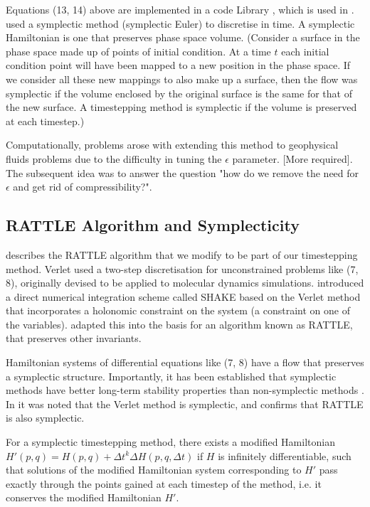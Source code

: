 \documentclass[11pt, oneside]{article}   	%
\newcommand{\dt}{\Delta t}
\begin{document}
Equations (13, 14) above are implemented in a code Library \cite{merigotpymongeampere}, which is used in \cite{gallouet2016lagrangian}. \cite{gallouet2016lagrangian} used a symplectic method (symplectic Euler) to discretise in time. A symplectic Hamiltonian is one that preserves phase space volume. (Consider a surface in the phase space made up of points of initial condition. At a time \(t\) each initial condition point will have been mapped to a new position in the phase space. If we consider all these new mappings to also make up a surface, then the flow was symplectic if the volume enclosed by the original surface is the same for that of the new surface. A timestepping method is symplectic if the volume is preserved at each timestep.)

Computationally, problems arose with extending this method to geophysical fluids problems due to the difficulty in tuning the \(\epsilon\) parameter. [More required]. The subsequent idea was to answer the question "how do we remove the need for \(\epsilon\) and get rid of compressibility?".

\subsection{RATTLE Algorithm and Symplecticity}

\cite{leimkuhler1994symplectic} describes the RATTLE algorithm that we modify to be part of our timestepping method. Verlet \cite{verlet1967computer} used a two-step discretisation for unconstrained problems like (7, 8), originally devised to be applied to molecular dynamics simulations. \cite{ryckaert1977numerical} introduced a direct numerical integration scheme called SHAKE based on the Verlet method that incorporates a holonomic constraint on the system (a constraint on one of the variables). \cite{andersen1983rattle} adapted this into the basis for an algorithm known as RATTLE, that preserves other invariants.

Hamiltonian systems of differential equations like (7, 8) have a flow that preserves a symplectic structure. Importantly, it has been established that symplectic methods have better long-term stability properties than non-symplectic methods \cite{okunbor1992explicit}. In \cite{ruth1983canonical} it was noted that the Verlet method is symplectic, and \cite{leimkuhler1994symplectic} confirms that RATTLE is also symplectic. 

For a symplectic timestepping method, there exists a modified Hamiltonian \(H'(p, q) = H(p, q) + \dt^k \Delta H(p, q, \dt)\) if \(H\) is infinitely differentiable, such that solutions of the modified Hamiltonian system corresponding to \(H'\) pass exactly through the points gained at each timestep of the method, i.e. it conserves the modified Hamiltonian \(H'\).
\end{document}
